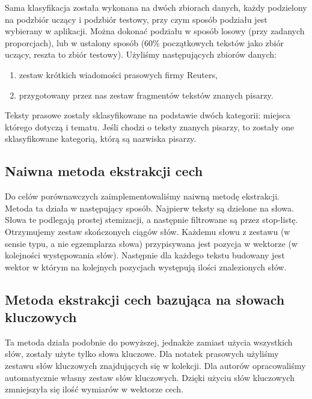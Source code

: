 \documentclass[a4paper]{classrep}
\begin{document}
Sama klasyfikacja została wykonana na dwóch zbiorach danych, każdy podzielony na podzbiór uczący i podzbiór testowy, przy czym sposób podziału jest wybierany w aplikacji.
Można dokonać podziału w sposób losowy (przy zadanych proporcjach), lub w ustalony sposób (60\% początkowych tekstów jako zbiór uczący, reszta to zbiór testowy).
Użyliśmy następujących zbiorów danych:
\begin{enumerate}
\item zestaw krótkich wiadomości prasowych firmy Reuters,
\item przygotowany przez nas zestaw fragmentów tekstów znanych pisarzy.
\end{enumerate}
Teksty prasowe zostały sklasyfikowane na podstawie dwóch kategorii: miejsca którego dotyczą i tematu.
Jeśli chodzi o teksty znanych pisarzy, to zostały one sklasyfikowane kategorią, którą są nazwiska pisarzy.
\subsection{Naiwna metoda ekstrakcji cech}
\label{sec:naiwna}
Do celów porównawczych zaimplementowaliśmy naiwną metodę ekstrakcji. Metoda ta działa w następujący sposób. Najpierw teksty są dzielone na słowa. Słowa te podlegają prostej stemizacji,
a następnie filtrowane są przez stop-listę. Otrzymujemy zestaw skończonych ciągów słów. Każdemu słowu z zestawu (w sensie typu, a nie egzemplarza słowa) przypisywana jest pozycja
w wektorze (w kolejności występowania słów). Następnie dla każdego tekstu budowany jest wektor w którym na kolejnych pozycjach występują ilości znalezionych słów.
\subsection{Metoda ekstrakcji cech bazująca na słowach kluczowych}
\label{sec:kluczowe}
Ta metoda działa podobnie do powyższej, jednakże zamiast użycia wszystkich słów, zostały użyte tylko słowa kluczowe. Dla notatek prasowych użyliśmy zestawu słów kluczowych znajdujących się w kolekcji. Dla autorów opracowaliśmy automatycznie własny zestaw słów kluczowych. Dzięki użyciu słów kluczowych zmniejszyła się ilość wymiarów w wektorze cech.
\end{document}
